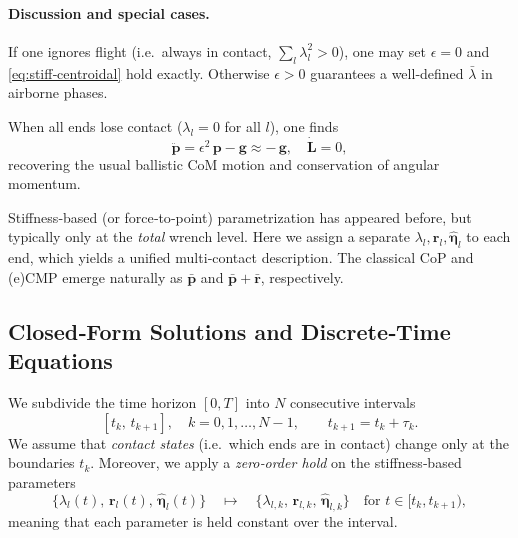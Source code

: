 \documentclass[main.tex]{subfiles}
\begin{document}
\paragraph{Discussion and special cases.}
\begin{remark}
If one ignores flight (i.e.\ always in contact, $\sum_l\lambda_l^2>0$), one may set $\epsilon=0$ and \eqref{eq:stiff‐centroidal} hold exactly.  Otherwise $\epsilon>0$ guarantees a well‐defined $\bar\lambda$ in airborne phases.
\end{remark}

\begin{remark}
When all ends lose contact ($\lambda_l=0$ for all $l$), one finds
\[
\ddot{\mathbf{p}} = \epsilon^2\,\mathbf{p} - \mathbf{g} \approx -\,\mathbf{g},
\quad
\dot{\mathbf{L}} = 0,
\]
recovering the usual ballistic CoM motion and conservation of angular momentum.
\end{remark}

\begin{remark}
Stiffness‐based (or force‐to‐point) parametrization has appeared before, but typically only at the \emph{total} wrench level.  Here we assign a separate $\lambda_l,\mathbf{r}_l,\mathbf{\hat{\boldsymbol{\eta}}}_l$ to each end, which yields a unified multi‐contact description.  The classical CoP and (e)CMP emerge naturally as $\mathbf{\bar{p}}$ and $\mathbf{\bar{p}}+\mathbf{\bar{r}}$, respectively.
\end{remark}

\subsection{Closed‐Form Solutions and Discrete‐Time Equations}

We subdivide the time horizon $[0,T]$ into $N$ consecutive intervals
\[
[t_k,\,t_{k+1}],\quad k=0,1,\dots,N-1,\qquad
t_{k+1}=t_k+\tau_k.
\]
We assume that \emph{contact states} (i.e.\ which ends are in contact) change only at the boundaries $t_k$.  Moreover, we apply a \emph{zero‐order hold} on the stiffness‐based parameters
\[
\{\lambda_{l}(t),\,\mathbf{r}_{l}(t),\,\mathbf{\hat{\boldsymbol{\eta}}}_{l}(t)\}
\quad\mapsto\quad
\{\lambda_{l,k},\,\mathbf{r}_{l,k},\,\mathbf{\hat{\boldsymbol{\eta}}}_{l,k}\}
\quad\text{for }t\in[t_k,t_{k+1}),
\]
meaning that each parameter is held constant over the interval.

\medskip
\end{document}
